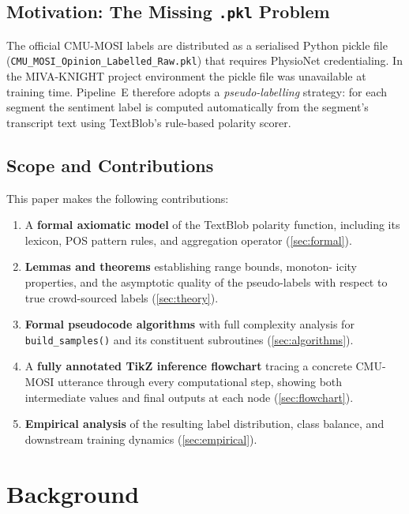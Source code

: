 \documentclass[12pt,a4paper]{article}
\theoremstyle{plain}
\theoremstyle{definition}
\begin{document}
\subsection{Motivation: The Missing \texttt{.pkl} Problem}

The official CMU-MOSI labels are distributed as a serialised Python
pickle file (\texttt{CMU\_MOSI\_Opinion\_Labelled\_Raw.pkl}) that
requires PhysioNet credentialing.  In the MIVA-KNIGHT project
environment the pickle file was unavailable at training time.
Pipeline~E therefore adopts a \emph{pseudo-labelling} strategy: for
each segment the sentiment label is computed automatically from the
segment's transcript text using TextBlob's rule-based polarity scorer.

\subsection{Scope and Contributions}

This paper makes the following contributions:
\begin{enumerate}[label=(\arabic*)]
  \item A \textbf{formal axiomatic model} of the TextBlob polarity
        function, including its lexicon, POS pattern rules, and
        aggregation operator (\cref{sec:formal}).
  \item \textbf{Lemmas and theorems} establishing range bounds, monoton-
        icity properties, and the asymptotic quality of the
        pseudo-labels with respect to true crowd-sourced labels
        (\cref{sec:theory}).
  \item \textbf{Formal pseudocode algorithms} with full complexity
        analysis for \texttt{build\_samples()} and its constituent
        subroutines (\cref{sec:algorithms}).
  \item A \textbf{fully annotated TikZ inference flowchart} tracing a
        concrete CMU-MOSI utterance through every computational step,
        showing both intermediate values and final outputs at each node
        (\cref{sec:flowchart}).
  \item \textbf{Empirical analysis} of the resulting label distribution,
        class balance, and downstream training dynamics
        (\cref{sec:empirical}).
\end{enumerate}

\section{Background}
\label{sec:background}
\end{document}
